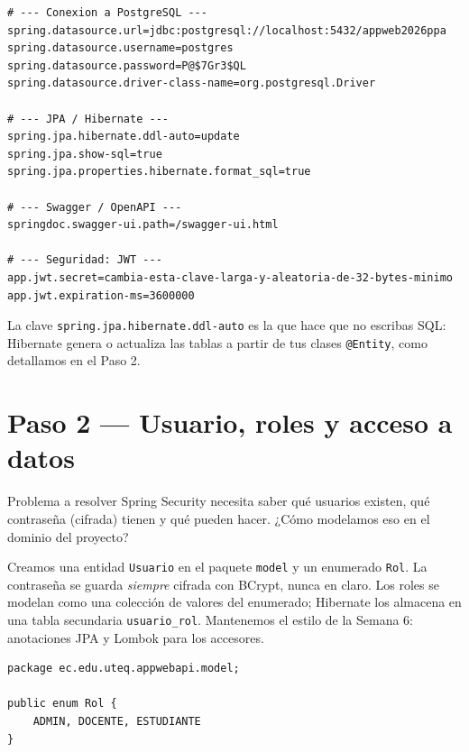 \documentclass[11pt]{article}
\begin{document}
\begin{cajacodigo}
\begin{lstlisting}[style=markup]
# --- Conexion a PostgreSQL ---
spring.datasource.url=jdbc:postgresql://localhost:5432/appweb2026ppa
spring.datasource.username=postgres
spring.datasource.password=P@$7Gr3$QL
spring.datasource.driver-class-name=org.postgresql.Driver

# --- JPA / Hibernate ---
spring.jpa.hibernate.ddl-auto=update
spring.jpa.show-sql=true
spring.jpa.properties.hibernate.format_sql=true

# --- Swagger / OpenAPI ---
springdoc.swagger-ui.path=/swagger-ui.html

# --- Seguridad: JWT ---
app.jwt.secret=cambia-esta-clave-larga-y-aleatoria-de-32-bytes-minimo
app.jwt.expiration-ms=3600000
\end{lstlisting}
\end{cajacodigo}

La clave \texttt{spring.\allowbreak{}jpa.\allowbreak{}hibernate.\allowbreak{}ddl-auto} es la que hace que no escribas SQL: Hibernate genera o actualiza las tablas a partir de tus clases \texttt{@Entity}, como detallamos en el Paso 2.

\section{Paso 2 --- Usuario, roles y acceso a datos}
\begin{cajaproblema}{Problema a resolver}
Spring Security necesita saber qué usuarios existen, qué contraseña (cifrada) tienen y qué pueden hacer. ¿Cómo modelamos eso en el dominio del proyecto?\par
\end{cajaproblema}
Creamos una entidad \texttt{Usuario} en el paquete \texttt{model} y un enumerado \texttt{Rol}. La contraseña se guarda \emph{siempre} cifrada con BCrypt, nunca en claro. Los roles se modelan como una colección de valores del enumerado; Hibernate los almacena en una tabla secundaria \texttt{usuario\_rol}. Mantenemos el estilo de la Semana 6: anotaciones JPA y Lombok para los accesores.

\begin{cajacodigo}
\begin{lstlisting}[style=java]
package ec.edu.uteq.appwebapi.model;

public enum Rol {
    ADMIN, DOCENTE, ESTUDIANTE
}
\end{lstlisting}
\end{cajacodigo}
\end{document}
